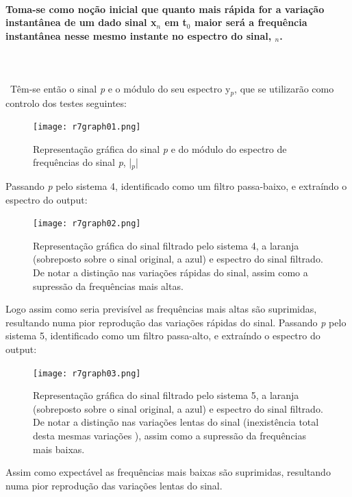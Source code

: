 \documentclass[a4paper,12pt]{article}
\begin{document}
			\paragraph{Toma-se como noção inicial que quanto mais rápida for a variação instantânea de um dado sinal x$_n$ em t$_0$ maior será a frequência instantânea nesse mesmo instante no espectro do sinal, $_n$.} \mbox{} \\ \mbox{} \\
			\mbox{	}Têm-se então o sinal \textit{p} e o módulo do seu espectro y$_p$, que se utilizarão como controlo dos testes seguintes:
			  \begin{figure}[H]
                                  \centering
                                  \captionsetup{justification=centering}
                                  \texttt{[image: r7graph01.png]}
                                \caption{Representação gráfica do sinal \textit{p} e do módulo do espectro de frequências do sinal \textit{p}, |$_p$|}
                          \end{figure}
			Passando \textit{p} pelo sistema 4, identificado como um filtro passa-baixo, e extraíndo o espectro do output:
			  \begin{figure}[H]
                                  \centering
                                  \captionsetup{justification=centering}
                                  \texttt{[image: r7graph02.png]}
                                \caption{Representação gráfica do sinal filtrado pelo sistema 4, a laranja (sobreposto sobre o sinal original, a azul) e espectro do sinal filtrado. De notar a distinção nas variações rápidas do sinal, assim como a supressão da frequências mais altas.}
                          \end{figure}
			Logo assim como seria previsível as frequências mais altas são suprimidas, resultando numa pior reprodução das variações rápidas do sinal.
			Passando \textit{p} pelo sistema 5, identificado como um filtro passa-alto, e extraíndo o espectro do output:
                          \begin{figure}[H]
                                  \centering
                                  \captionsetup{justification=centering}
                                  \texttt{[image: r7graph03.png]}
                                \caption{Representação gráfica do sinal filtrado pelo   sistema 5, a laranja (sobreposto sobre o sinal original, a azul) e espectro do sinal filtrado. De notar  a distinção nas variações lentas do sinal (inexistência total desta mesmas variações ), assim como a supressão da frequências mais baixas.}
                          \end{figure}
                        Assim como expectável as frequências mais baixas são suprimidas, resultando numa pior reprodução das variações lentas do sinal.
			\newpage
\end{document}
